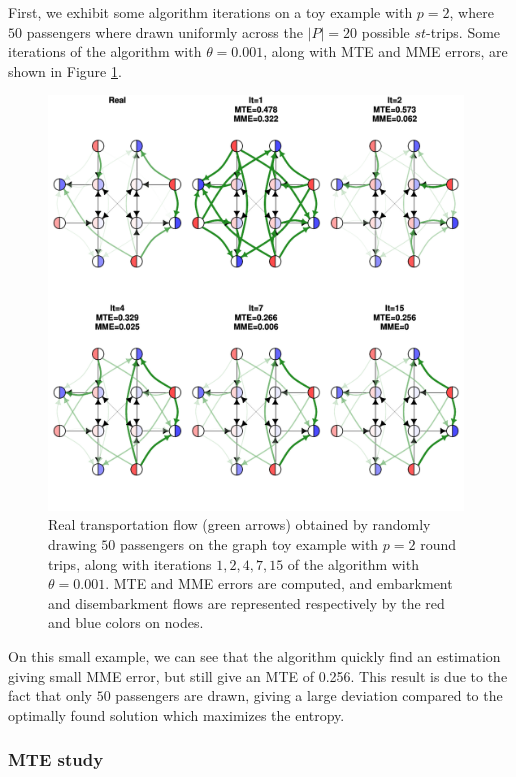 \documentclass{bmcart}
\begin{document}
First, we exhibit some algorithm iterations on a toy example with $p=2$, where $50$ passengers where drawn uniformly across the $\vert P \vert = 20$ possible $st$-trips. Some iterations of the algorithm with $\theta=0.001$, along with MTE and MME errors, are shown in Figure \ref{iteration_plots}. 
\begin{figure}[h]
	\includegraphics[width=0.98\textwidth]{fig/iterations.pdf}
	\caption{Real transportation flow (green arrows) obtained by randomly drawing $50$ passengers on the graph toy example with $p=2$ round trips, along with iterations $1, 2, 4, 7, 15$ of the algorithm with $\theta=0.001$. MTE and MME errors are computed, and embarkment and disembarkment flows are represented respectively by the red and blue colors on nodes.}
	\label{iteration_plots}
\end{figure}
On this small example, we can see that the algorithm quickly find an estimation giving small MME error, but still give an MTE of 0.256. This result is due to the fact that only $50$ passengers are drawn, giving a large deviation compared to the optimally found solution which maximizes the entropy.

\subsubsection{MTE study}
\label{mte_study}
\end{document}
